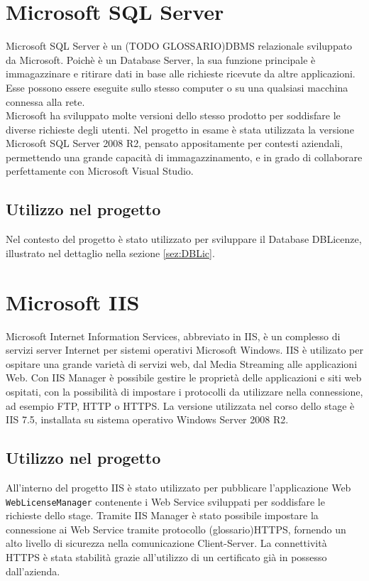 \section{Microsoft SQL Server}

Microsoft SQL Server è un (TODO GLOSSARIO)DBMS relazionale sviluppato da Microsoft. Poichè è un Database Server, la sua funzione principale è immagazzinare e ritirare dati in base alle richieste ricevute da altre applicazioni. Esse possono essere eseguite sullo stesso computer o su una qualsiasi macchina connessa alla rete.
\\
Microsoft ha sviluppato molte versioni dello stesso prodotto per soddisfare le diverse richieste degli utenti. Nel progetto in esame è stata utilizzata la versione Microsoft SQL Server 2008 R2, pensato appositamente per contesti aziendali, permettendo una grande capacità di immagazzinamento, e in grado di collaborare perfettamente con Microsoft Visual Studio.

\subsection{Utilizzo nel progetto}

Nel contesto del progetto è stato utilizzato per sviluppare il Database DBLicenze, illustrato nel dettaglio nella sezione \ref{sez:DBLic}.

\section{Microsoft IIS}

Microsoft Internet Information Services, abbreviato in IIS, è un complesso di servizi server Internet per sistemi operativi Microsoft Windows.
IIS è utilizato per ospitare una grande varietà di servizi web, dal Media Streaming alle applicazioni Web. Con IIS Manager è possibile gestire le proprietà delle applicazioni e siti web ospitati, con la possibilità di impostare i protocolli da utilizzare nella connessione, ad esempio FTP, HTTP o HTTPS. 
La versione utilizzata nel corso dello stage è IIS 7.5, installata su sistema operativo Windows Server 2008 R2.


\subsection{Utilizzo nel progetto}
All'interno del progetto IIS è stato utilizzato per pubblicare l'applicazione Web \texttt{WebLicenseManager} contenente i Web Service sviluppati per soddisfare le richieste dello stage. Tramite IIS Manager è stato possibile impostare la connessione ai Web Service tramite protocollo (glossario)HTTPS, fornendo un alto livello di sicurezza nella comunicazione Client-Server. La connettività HTTPS è stata stabilità grazie all'utilizzo di un certificato già in possesso dall'azienda.

